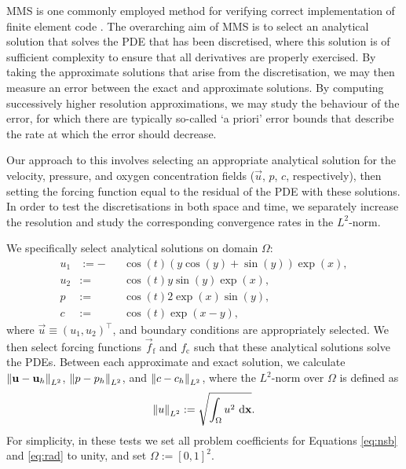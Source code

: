         MMS is one commonly employed method for verifying correct implementation of finite element code \cite{roacheCodeVerificationMethod2002}. The overarching aim of MMS is to select an analytical solution that solves the PDE that has been discretised, where this solution is of sufficient complexity to ensure that all derivatives are properly exercised. By taking the approximate solutions that arise from the discretisation, we may then measure an error between the exact and approximate solutions. By computing successively higher resolution approximations, we may study the behaviour of the error, for which there are typically so-called `a priori' error bounds that describe the rate at which the error should decrease.
        
        Our approach to this involves selecting an appropriate analytical solution for the velocity, pressure, and oxygen concentration fields ($\vec{u}$, $p$, $c$, respectively), then setting the forcing function equal to the residual of the PDE with these solutions. In order to test the discretisations in both space and time, we separately increase the resolution and study the corresponding convergence rates in the $L^2$-norm.

        We specifically select analytical solutions on domain $\Omega$:
        \begin{subequations}
            \begin{alignat}{3}
                u_1 & := - && \cos(t)(y\cos(y) + \sin(y))\exp(x), \label{eq:analytical-solutions:u1}\\
                u_2 & := && \cos(t)y\sin(y)\exp(x), \label{eq:analytical-solutions:u2}\\
                p & := && \cos(t) 2 \exp(x) \sin(y), \label{eq:analytical-solutions:p}\\
                c & := && \cos(t) \exp(x - y), \label{eq:analytical-solutions:c}
            \end{alignat}%
            \label{eq:analytical-solutions}%
        \end{subequations}%
        where $\vec{u} \equiv (u_1, u_2)^\intercal$, and boundary conditions are appropriately selected. We then select forcing functions $\vec{f}_\text{f}$ and $f_\text{c}$ such that these analytical solutions solve the PDEs. Between each approximate and exact solution, we calculate $\norm{\boldsymbol{\mathbf{u}} - \boldsymbol{\mathbf{u}}_h}_{L^2}$, $\norm{p - p_h}_{L^2}$, and $\norm{c - c_h}_{L^2}$, where the $L^2$-norm over $\Omega$ is defined as
        \begin{equation}
            \norm{u}_{L^2} := \sqrt{\int_\Omega u^2 ~\mathrm{d} \boldsymbol{\mathbf{x}}}.
        \end{equation}
        For simplicity, in these tests we set all problem coefficients for Equations \eqref{eq:nsb} and \eqref{eq:rad} to unity, and set $\Omega := [0, 1]^2$. 


